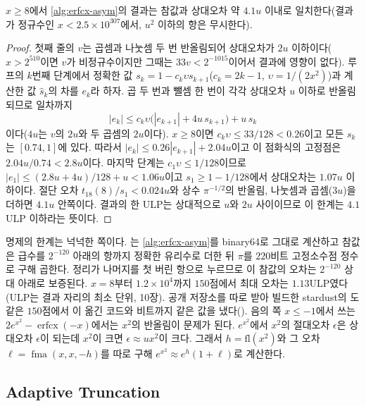 \begin{proposition}
\label{prop:erfcx-rounding}
$x\ge8$에서 \cref{alg:erfcx-asym}의 결과는 참값과 상대오차 약 $4.1u$ 이내로 일치한다(결과가 정규수인 $x<2.5\times10^{307}$에서, $u^2$ 이하의 항은 무시한다).
\end{proposition}

\begin{proof}
첫째 줄의 $v$는 곱셈과 나눗셈 두 번 반올림되어 상대오차가 $2u$ 이하이다($x>2^{510}$이면 $v$가 비정규수이지만 그때는 $33v<2^{-1015}$이어서 결과에 영향이 없다). 루프의 $k$번째 단계에서 정확한 값 $s_k=1-c_k\upsilon s_{k+1}$($c_k=2k-1$, $\upsilon=1/(2x^2)$)과 계산한 값 $\hat s_k$의 차를 $e_k$라 하자. 곱 두 번과 뺄셈 한 번이 각각 상대오차 $u$ 이하로 반올림되므로 일차까지
\[
|e_k|\le c_k\upsilon\bigl(|e_{k+1}|+4u\,s_{k+1}\bigr)+u\,s_k
\]
이다($4u$는 $v$의 $2u$와 두 곱셈의 $2u$이다). $x\ge8$이면 $c_k\upsilon\le33/128<0.26$이고 모든 $s_k$는 $[0.74,1]$에 있다. 따라서 $|e_k|\le0.26|e_{k+1}|+2.04u$이고 이 점화식의 고정점은 $2.04u/0.74<2.8u$이다. 마지막 단계는 $c_1\upsilon\le1/128$이므로 $|e_1|\le(2.8u+4u)/128+u<1.06u$이고 $s_1\ge1-1/128$에서 상대오차는 $1.07u$ 이하이다. 절단 오차 $t_{18}(8)/s_1<0.024u$와 상수 $\pi^{-1/2}$의 반올림, 나눗셈과 곱셈($3u$)을 더하면 $4.1u$ 안쪽이다. 결과의 한 ULP는 상대적으로 $u$와 $2u$ 사이이므로 이 한계는 $4.1$ULP 이하라는 뜻이다.
\end{proof}

명제의 한계는 넉넉한 쪽이다. 는 \cref{alg:erfcx-asym}를 binary64로 그대로 계산하고 참값은 급수를 $2^{-120}$ 아래의 항까지 정확한 유리수로 더한 뒤 $\pi$를 $220$비트 고정소수점 정수로 구해 곱한다. 정리가 나머지를 첫 버린 항으로 누르므로 이 참값의 오차는 $2^{-120}$ 상대 아래로 보증된다. $x=8$부터 $1.2\times10^4$까지 $150$점에서 최대 오차는 $1.13$ULP였다(ULP는 결과 자리의 최소 단위, 10장). 공개 저장소를 따로 받아 빌드한 stardust의 도 같은 $150$점에서 이 옮긴 코드와 비트까지 같은 값을 냈다(). 음의 쪽 $x\le-1$에서 쓰는 $2e^{x^2}-\operatorname{erfcx}(-x)$에서는 $x^2$의 반올림이 문제가 된다. $e^{x^2}$에서 $x^2$의 절대오차 $\epsilon$은 상대오차 $\epsilon$이 되는데 $x^2$이 크면 $\epsilon\approx ux^2$이 크다. 그래서 $h=\mathrm{fl}(x^2)$와 그 오차 $\ell=\operatorname{fma}(x,x,-h)$를 따로 구해 $e^{x^2}\approx e^h(1+\ell)$로 계산한다.


\subsection{Adaptive Truncation}

